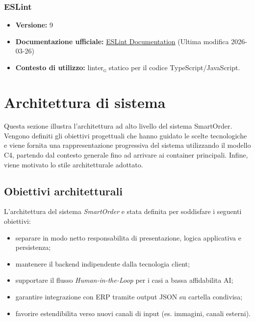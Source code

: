 \documentclass[a4paper, 11pt, oneside]{scrartcl}
\begin{document}
\subsubsection{ESLint}
\begin{itemize}[noitemsep]
    \item \textbf{Versione:} 9
    \item \textbf{Documentazione ufficiale:} \href{https://eslint.org/docs/latest/}{ESLint Documentation} (Ultima modifica 2026-03-26)
    \item \textbf{Contesto di utilizzo:} linter\textsubscript{\textsc{g}} statico per il codice TypeScript/JavaScript.
\end{itemize}



\newpage
%

\newpage
\section{Architettura di sistema}
Questa sezione illustra l'architettura ad alto livello del sistema SmartOrder. Vengono definiti gli obiettivi progettuali che hanno guidato le scelte tecnologiche e viene fornita una rappresentazione progressiva del sistema utilizzando il modello C4, partendo dal contesto generale fino ad arrivare ai container principali. Infine, viene motivato lo stile architetturale adottato.

\subsection{Obiettivi architetturali}
L'architettura del sistema \textit{SmartOrder} e stata definita per soddisfare i seguenti obiettivi:
\begin{itemize}
    \item separare in modo netto responsabilita di presentazione, logica applicativa e persistenza;
    \item mantenere il backend indipendente dalla tecnologia client;
    \item supportare il flusso \textit{Human-in-the-Loop} per i casi a bassa affidabilita AI;
    \item garantire integrazione con ERP tramite output JSON su cartella condivisa;
    \item favorire estendibilita verso nuovi canali di input (es. immagini, canali esterni).
\end{itemize}
\end{document}
